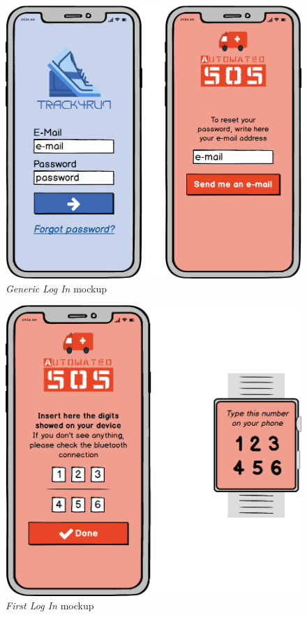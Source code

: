 \begin{figure}
\begin{center}
  \includegraphics[width=\textwidth]{img/mockup/Generic_Login.png}
  \hspace{0.05\linewidth}
  \centering
  \caption{\textit{Generic Log In} mockup}
  \label{img:genericLogInMockup}
\end{center}
\end{figure}

\begin{figure}
\begin{center}
  \includegraphics[width=\textwidth]{img/mockup/First_Login.png}
  \hspace{0.05\linewidth}
  \centering
  \caption{\textit{First Log In} mockup}
  \label{img:firstLogInMockup}
\end{center}
\end{figure}
